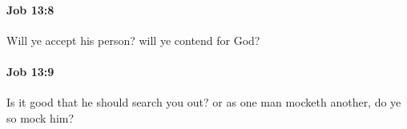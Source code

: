 		\paragraph{Job 13:8} %
			\label{JOB-13-8}

			Will ye accept his person? will ye contend for God?


		\paragraph{Job 13:9} %
			\label{JOB-13-9}

			Is it good that he should search you out? or as one man mocketh another, do ye so mock him?


